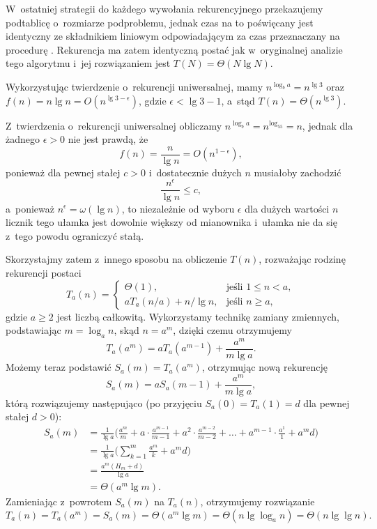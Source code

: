 W~ostatniej strategii do każdego wywołania rekurencyjnego przekazujemy podtablicę o~rozmiarze podproblemu, jednak czas na to poświęcany jest identyczny ze składnikiem liniowym odpowiadającym za czas przeznaczany na procedurę .
Rekurencja ma zatem identyczną postać jak w~oryginalnej analizie tego algorytmu i~jej rozwiązaniem jest $T(N)=\Theta(N\lg N)$.


\subproblem %
Wykorzystując twierdzenie o~rekurencji uniwersalnej, mamy $n^{\log_ba}=n^{\lg3}$ oraz $f(n)=n\lg n=O(n^{\lg3-\epsilon})$, gdzie $\epsilon<\lg3-1$, a~stąd $T(n)=\Theta(n^{\lg3})$.

\subproblem %
Z~twierdzenia o~rekurencji uniwersalnej obliczamy $n^{\log_ba}=n^{\log_55}=n$, jednak dla żadnego $\epsilon>0$ nie jest prawdą, że
\[
	f(n) = \frac{n}{\lg n} = O(n^{1-\epsilon}),
\]
ponieważ dla pewnej stałej $c>0$ i~dostatecznie dużych $n$ musiałoby zachodzić
\[
	\frac{n^\epsilon}{\lg n} \le c,
\]
a~ponieważ $n^\epsilon=\omega(\lg n)$, to niezależnie od wyboru $\epsilon$ dla dużych wartości $n$ licznik tego ułamka jest dowolnie większy od mianownika i~ułamka nie da się z~tego powodu ograniczyć stałą.

Skorzystajmy zatem z~innego sposobu na obliczenie $T(n)$, rozważając rodzinę rekurencji postaci
\[
	T_a(n) = \begin{cases}
		\Theta(1), & \text{jeśli $1\le n<a$}, \\
		aT_a(n/a)+n/\!\lg n, & \text{jeśli $n\ge a$},
	\end{cases}
\]
gdzie $a\ge2$ jest liczbą całkowitą.
Wykorzystamy technikę zamiany zmiennych, podstawiając $m=\log_an$, skąd $n=a^m$, dzięki czemu otrzymujemy
\[
	T_a(a^m) = aT_a(a^{m-1})+\frac{a^m}{m\lg a}.
\]
Możemy teraz podstawić $S_a(m)=T_a(a^m)$, otrzymując nową rekurencję
\[
	S_a(m) = aS_a(m-1)+\frac{a^m}{m\lg a},
\]
którą rozwiązujemy następująco (po przyjęciu $S_a(0)=T_a(1)=d$ dla pewnej stałej $d>0$):
\begin{align*}
	S_a(m) &= \frac{1}{\lg a}\biggl(\frac{a^m}{m}+a\cdot\frac{a^{m-1}}{m-1}+a^2\cdot\frac{a^{m-2}}{m-2}+\dots+a^{m-1}\cdot\frac{a^1}{1}+a^md\biggr) \\[1mm]
	&= \frac{1}{\lg a}\biggl(\sum_{k=1}^m\frac{a^m}{k}+a^md\biggr) \\[1mm]
	&= \frac{a^m(H_m+d)}{\lg a} \\[1mm]
	&= \Theta(a^m\lg m).
\end{align*}
Zamieniając z~powrotem $S_a(m)$ na $T_a(n)$, otrzymujemy rozwiązanie
\[
	T_a(n) = T_a(a^m) = S_a(m) = \Theta(a^m\lg m) = \Theta(n\lg\log_a n) = \Theta(n\lg\lg n).
\]

